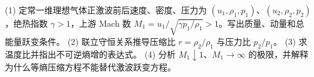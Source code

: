 (1) 定常一维理想气体正激波前后速度、密度、压力为 \((u_1,\rho_1,p_1)\)、\((u_2,\rho_2,p_2)\)，绝热指数 \(\gamma>1\)，上游 Mach 数 \(M_1=u_1/\sqrt{\gamma p_1/\rho_1}>1\)。写出质量、动量和总能量跃变条件。
(2) 联立守恒关系推导压缩比 \(r=\rho_2/\rho_1\) 与压力比 \(p_2/p_1\)。
(3) 求温度比并指出不可逆熵增的表达式。
(4) 分析 \(M_1\downarrow1\)、\(M_1\to\infty\) 的极限，并解释为什么等熵压缩方程不能替代激波跃变方程。

